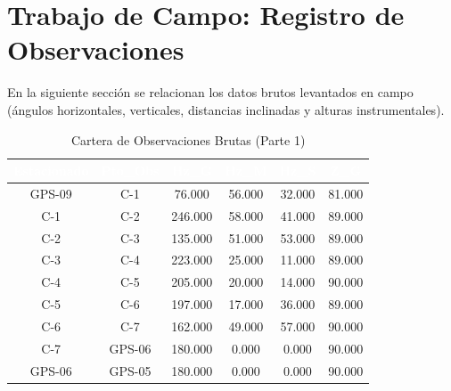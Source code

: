 \documentclass[11pt,letterpaper]{article}
\begin{document}
\section{Trabajo de Campo: Registro de Observaciones}
En la siguiente sección se relacionan los datos brutos levantados en campo (ángulos horizontales, verticales, distancias inclinadas y alturas instrumentales).
\begin{table}[H]
  \centering
  \small
  \caption{Cartera de Observaciones Brutas (Parte 1)}
  \label{tab:campo_0}
  \begin{tabular}{|c|c|c|c|c|c|}
    \hline
    \rowcolor{GeoBlue}
    \textcolor{white}{\textbf{Estacionado}} & \textcolor{white}{\textbf{Pto\_Obs}} & \textcolor{white}{\textbf{Hz\_G}} & \textcolor{white}{\textbf{Hz\_M}} & \textcolor{white}{\textbf{Hz\_S}} & \textcolor{white}{\textbf{Z\_G}} \\
    \hline
    \rowcolor{GeoBlue!5}
    GPS-09 & C-1 & 76.000 & 56.000 & 32.000 & 81.000 \\
    \hline
    \rowcolor{white}
    C-1 & C-2 & 246.000 & 58.000 & 41.000 & 89.000 \\
    \hline
    \rowcolor{GeoBlue!5}
    C-2 & C-3 & 135.000 & 51.000 & 53.000 & 89.000 \\
    \hline
    \rowcolor{white}
    C-3 & C-4 & 223.000 & 25.000 & 11.000 & 89.000 \\
    \hline
    \rowcolor{GeoBlue!5}
    C-4 & C-5 & 205.000 & 20.000 & 14.000 & 90.000 \\
    \hline
    \rowcolor{white}
    C-5 & C-6 & 197.000 & 17.000 & 36.000 & 89.000 \\
    \hline
    \rowcolor{GeoBlue!5}
    C-6 & C-7 & 162.000 & 49.000 & 57.000 & 90.000 \\
    \hline
    \rowcolor{white}
    C-7 & GPS-06 & 180.000 & 0.000 & 0.000 & 90.000 \\
    \hline
    \rowcolor{GeoBlue!5}
    GPS-06 & GPS-05 & 180.000 & 0.000 & 0.000 & 90.000 \\
    \hline
  \end{tabular}
\end{table}
\vspace{0.8cm}
\end{document}

